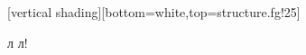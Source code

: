 \section[]{}
[vertical
shading][bottom=white,top=structure.fg!25]
\begin{frame}
 \begin{center}
{\huge\textcolor[rgb]{0.50,0.00,1.00}{л л!}}
\end{center}
\end{frame}

